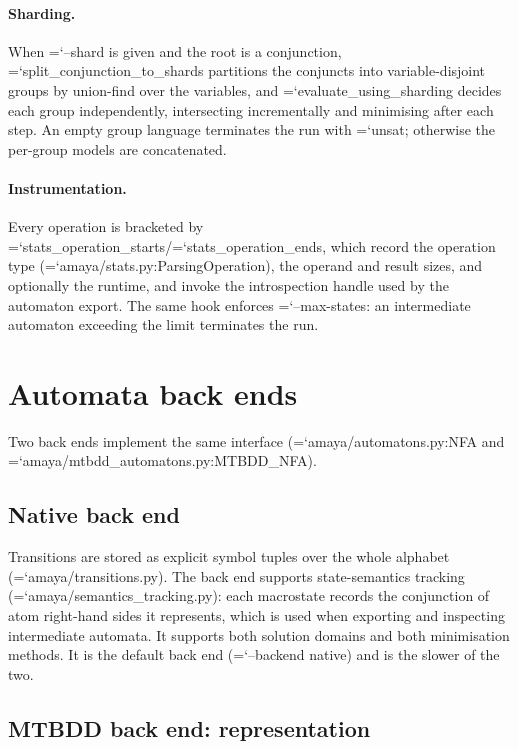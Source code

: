 \documentclass[10pt,a4paper]{article}
\newcommand{\code}[1]{{\small\ttfamily\hyphenchar\font=`\-\relax #1}}
\begin{document}
\paragraph{Sharding.}
When \code{--shard} is given and the root is a conjunction, \code{split\_conjunction\_to\_shards}
partitions the conjuncts into variable-disjoint groups by union-find over the variables, and
\code{evaluate\_using\_sharding} decides each group independently, intersecting incrementally and
minimising after each step.  An empty group language terminates the run with \code{unsat}; otherwise
the per-group models are concatenated.

\paragraph{Instrumentation.}
Every operation is bracketed by \code{stats\_operation\_starts}/\code{stats\_operation\_ends}, which
record the operation type (\code{amaya/stats.py:\allowbreak ParsingOperation}), the operand and result sizes, and
optionally the runtime, and invoke the introspection handle used by the automaton export.  The same
hook enforces \code{--max-states}: an intermediate automaton exceeding the limit terminates the run.

\section{Automata back ends}
\label{sec:backend}

Two back ends implement the same interface (\code{amaya/automatons.py:\allowbreak NFA} and
\code{amaya/mtbdd\_\allowbreak automatons.py:\allowbreak MTBDD\_\allowbreak NFA}).

\subsection{Native back end}

Transitions are stored as explicit symbol tuples over the whole alphabet
(\code{amaya/transitions.py}).  The back end supports state-semantics tracking
(\code{amaya/semantics\_tracking.py}): each macrostate records the conjunction of atom right-hand sides
it represents, which is used when exporting and inspecting intermediate automata.  It supports both
solution domains and both minimisation methods.  It is the default back end
(\code{--backend native}) and is the slower of the two.

\subsection{MTBDD back end: representation}
\end{document}
